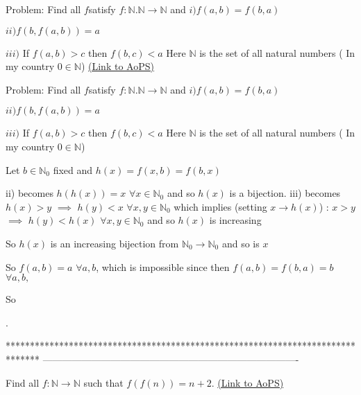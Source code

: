 \begin{problem}
	Problem: Find all $f$satisfy $f:\mathbb{N.N}\rightarrow\mathbb{N}$ and
$i)f(a,b)=f(b,a)$

$ii)f(b,f(a,b))=a$

$iii)$ If $f(a,b)>c$ then $f(b,c)<a$
Here $\mathbb{N}$ is the set of all natural numbers ( In my country $0 \in \mathbb{N}$)
	\flushright \href{https://artofproblemsolving.com/community/c6h482395}{(Link to AoPS)}
\end{problem}



\begin{solution}
	\begin{tcolorbox}Problem: Find all $f$satisfy $f:\mathbb{N.N}\rightarrow\mathbb{N}$ and
$i)f(a,b)=f(b,a)$

$ii)f(b,f(a,b))=a$

$iii)$ If $f(a,b)>c$ then $f(b,c)<a$
Here $\mathbb{N}$ is the set of all natural numbers ( In my country $0 \in \mathbb{N}$)\end{tcolorbox}
Let $b\in\mathbb N_0$ fixed and $h(x)=f(x,b)=f(b,x)$

ii) becomes $h(h(x))=x$ $\forall x\in\mathbb N_0$ and so $h(x)$ is a bijection.
iii) becomes $h(x)>y$ $\implies$ $h(y)<x$ $\forall x,y\in\mathbb N_0$ which implies (setting $x\to h(x)$) :
$x>y$ $\implies$ $h(y)<h(x)$ $\forall x,y\in\mathbb N_0$ and so $h(x)$ is increasing

So $h(x)$ is an increasing bijection from $\mathbb N_0\to\mathbb N_0$ and so is $x$

So $f(a,b)=a$ $\forall a,b$, which is impossible since then $f(a,b)=f(b,a)=b$ $\forall a,b,$

So.
\end{solution}
*******************************************************************************
-------------------------------------------------------------------------------

\begin{problem}
	Find all $f:\mathbb{N}\to \mathbb{N}$ such that $f(f(n))=n+2$.
	\flushright \href{https://artofproblemsolving.com/community/c6h483104}{(Link to AoPS)}
\end{problem}



